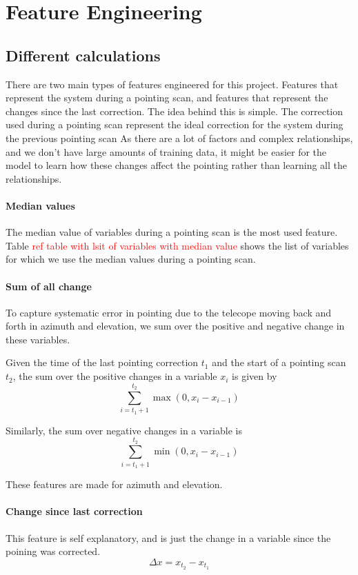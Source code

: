 \section{Feature Engineering}
\subsection{Different calculations}
There are two main types of features engineered for this project.
Features that represent the system during a pointing scan, and features that represent the changes since the last correction. 
The idea behind this is simple. The correction used during a pointing scan represent the ideal correction for the system during the previous pointing scan
As there are a lot of factors and complex relationships, and we don't have large amounts of training data, it might be easier for the model to learn 
how these changes affect the pointing rather than learning all the relationships.

\paragraph{Median values}
The median value of variables during a pointing scan is the most used feature.
Table \textcolor{red}{ref table with lsit of variables with median value} shows the list of variables for which we use the median values during a pointing scan.
\paragraph{Sum of all change}
To capture systematic error in pointing due to the telecope moving back and forth in azimuth and elevation,
we sum over the positive and negative change in these variables.

Given the time of the last pointing correction $t_1$ and the start of a pointing scan $t_2$, the sum over the positive changes in a variable $x_i$ is given by
\begin{equation}\label{eq:positive_int}
    \sum_{i=t_1+1}^{t_2} \max(0, x_i-x_{i-1})
\end{equation}

Similarly, the sum over negative changes in a variable is
\begin{equation}\label{eq:negative_int}
    \sum_{i=t_1+1}^{t_2} \min(0, x_i-x_{i-1})
\end{equation}

These features are made for azimuth and elevation.

\paragraph{Change since last correction}
This feature is self explanatory, and is just the change in a variable since the poining was corrected.
\begin{equation}
    \Delta x = x_{t_2} - x_{t_1}
\end{equation}

